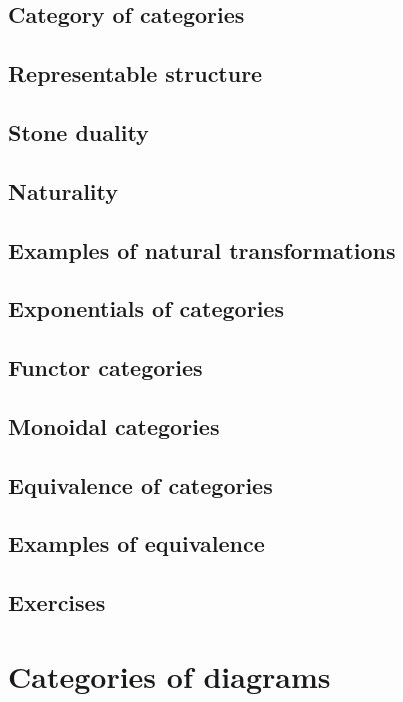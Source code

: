 \documentclass[uplatex, dvipdfmx]{jsarticle}
\begin{document}
\subsection{Category of categories}

\subsection{Representable structure}

\subsection{Stone duality}

\subsection{Naturality}

\subsection{Examples of natural transformations}

\subsection{Exponentials of categories}

\subsection{Functor categories}

\subsection{Monoidal categories}

\subsection{Equivalence of categories}

\subsection{Examples of equivalence}

\subsection{Exercises}

\section{Categories of diagrams}
\end{document}
